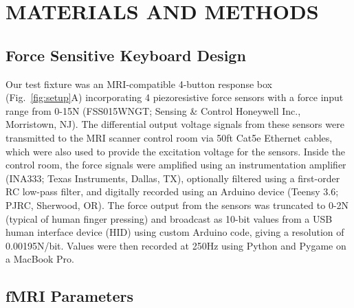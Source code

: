 \documentclass[letterpaper, 10 pt, conference]{ieeeconf}  %
\begin{document}
\section{MATERIALS AND METHODS}

\subsection{Force Sensitive Keyboard Design}

Our test fixture was an MRI-compatible 4-button response box (Fig.\ \ref{fig:setup}A) incorporating 4 piezoresistive force sensors with a force input range from 0-15N (FSS015WNGT; Sensing \& Control Honeywell Inc., Morristown, NJ). The differential output voltage signals from these sensors were transmitted to the MRI scanner control room via 50ft Cat5e Ethernet cables, which were also used to provide the excitation voltage for the sensors. Inside the control room, the force signals were amplified using an instrumentation amplifier (INA333; Texas Instruments, Dallas, TX), optionally filtered using a first-order RC low-pass filter, and digitally recorded using an Arduino device (Teensy 3.6; PJRC, Sherwood, OR). The force output from the sensors was truncated to 0-2N (typical of human finger pressing) and broadcast as 10-bit values from a USB human interface device (HID) using custom Arduino code, giving a resolution of 0.00195N/bit. Values were then recorded at 250Hz using Python and Pygame on a MacBook Pro.





\subsection{fMRI Parameters}
\end{document}
